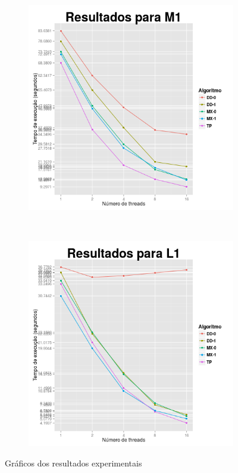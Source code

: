 \documentclass[10pt,a4paper,oneside]{article}
\begin{document}
\begin{figure}[t]
    \begin{subfigure}[b]{0.49\textwidth}
      \centering
      \includegraphics[width=\textwidth]{M1.png}
    \end{subfigure}
    ~
    \begin{subfigure}[b]{0.49\textwidth}
      \centering
      \includegraphics[width=\textwidth]{L1.png}
    \end{subfigure}

    \caption{Gráficos dos resultados experimentais}
    \label{fig:res}
\end{figure}
\end{document}
